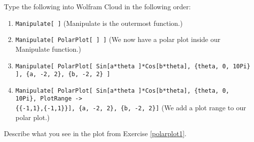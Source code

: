\begin{exercise}\label{polarplot1}
Type the following into Wolfram Cloud in the following order:
\begin{enumerate}
    \item \lstinline$Manipulate[ ]$ (Manipulate is the outermost function.)
    \item \lstinline$Manipulate[ PolarPlot[ ] ]$ (We now have a polar plot inside our Manipulate function.)
    \item \lstinline$Manipulate[ PolarPlot[ Sin[a*theta ]*Cos[b*theta], {theta, 0, 10Pi} ], {a, -2, 2}, {b, -2, 2} ]$
    \item \lstinline$Manipulate[ PolarPlot[ Sin[a*theta ]*Cos[b*theta], {theta, 0, 10Pi}, PlotRange ->$ \\ \lstinline${{-1,1},{-1,1}}], {a, -2, 2}, {b, -2, 2}]$ (We add a plot range to our polar plot.)
\end{enumerate}

\end{exercise}


\begin{exercise}
Describe what you see in the plot from Exercise \ref{polarplot1}.
\end{exercise}

\blanks
\blanks


